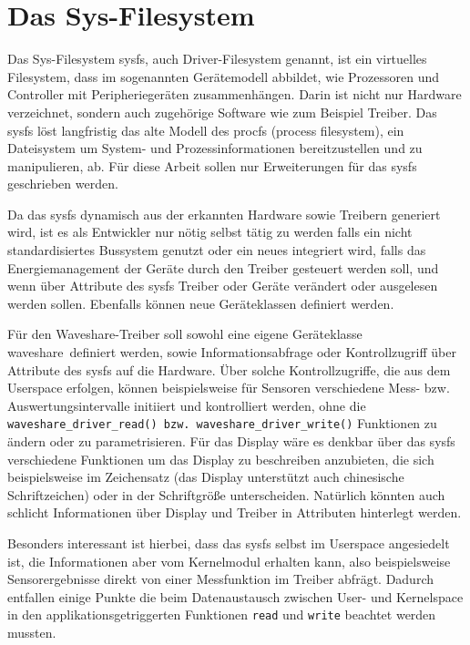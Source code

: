\section{Das Sys-Filesystem} %
Das Sys-Filesystem sysfs, auch Driver-Filesystem genannt, ist ein virtuelles Filesystem, dass im sogenannten Gerätemodell abbildet, wie Prozessoren und Controller mit Peripheriegeräten zusammenhängen. Darin ist nicht nur Hardware verzeichnet, sondern auch zugehörige Software wie zum Beispiel Treiber. Das sysfs löst langfristig das alte Modell des procfs (process filesystem), ein Dateisystem um System- und Prozessinformationen bereitzustellen und zu manipulieren, ab. Für diese Arbeit sollen nur Erweiterungen für das sysfs geschrieben werden. 

Da das sysfs dynamisch aus der erkannten Hardware sowie Treibern generiert wird, ist es als Entwickler nur nötig selbst tätig zu werden falls ein nicht standardisiertes Bussystem genutzt oder ein neues integriert wird, falls das Energiemanagement der Geräte durch den Treiber gesteuert werden soll, und wenn über Attribute des sysfs Treiber oder Geräte verändert oder ausgelesen werden sollen. Ebenfalls können neue Geräteklassen definiert werden. 

Für den Waveshare-Treiber soll sowohl eine eigene Geräteklasse \glqq waveshare\grqq~definiert werden, sowie Informationsabfrage oder Kontrollzugriff über Attribute des sysfs auf die Hardware. Über solche Kontrollzugriffe, die aus dem Userspace erfolgen, können beispielsweise für Sensoren verschiedene Mess- bzw. Auswertungsintervalle initiiert und kontrolliert werden, ohne die \texttt{waveshare_driver_read() bzw. waveshare_driver_write()} Funktionen zu ändern oder zu parametrisieren. Für das Display wäre es denkbar über das sysfs verschiedene Funktionen um das Display zu beschreiben anzubieten, die sich beispielsweise im Zeichensatz (das Display unterstützt auch chinesische Schriftzeichen) oder in der Schriftgröße unterscheiden. Natürlich könnten auch schlicht Informationen über Display und Treiber in Attributen hinterlegt werden. 

Besonders interessant ist hierbei, dass das sysfs selbst im Userspace angesiedelt ist, die Informationen aber vom Kernelmodul erhalten kann, also beispielsweise Sensorergebnisse direkt von einer Messfunktion im Treiber abfrägt. Dadurch entfallen einige Punkte die beim Datenaustausch zwischen User- und Kernelspace in den applikationsgetriggerten Funktionen \texttt{read} und \texttt{write} beachtet werden mussten.


